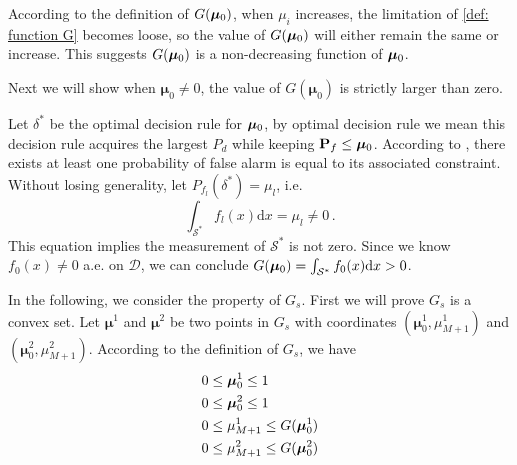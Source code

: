 According to the definition of $G(\boldsymbol{\mu}_0)$, when $\mu_i$ increases, the limitation of \eqref{def: function G} becomes loose, 
so the value of $G(\boldsymbol{\mu}_0)$ will either remain the same or increase. 
This suggests $G(\boldsymbol{\mu}_0)$ is a non-decreasing function of $\boldsymbol{\mu}_0$. 

Next we will show when $\boldsymbol{\mu}_0 \neq 0$, the value of $G(\boldsymbol{\mu}_0)$ is strictly larger than zero.

Let $\delta^\ast$ be the optimal decision rule for $\boldsymbol{\mu}_0$, by optimal decision rule we mean this decision rule acquires the largest $P_d$ while keeping $\mathbf{P}_f \leq \boldsymbol{\mu}_0$. 
According to \cite{zhang2000efficient}, there exists at least one probability of false alarm is equal to its associated constraint. Without losing generality, let $P_{f_l}(\delta^\ast) = \mu_l$, i.e. 
\[
\int_{\mathcal{S}^\ast}f_l(x)\mathrm{d}x = \mu_l \neq 0\,.
\]
This equation implies the measurement of $\mathcal{S}^\ast$  is not zero. Since we know $f_0(x) \neq 0$ a.e. on $\mathcal{D}$, we can conclude $G(\boldsymbol{\mu}_0) = \int_{\mathcal{S}^\ast}f_0(x)\mathrm{d}x > 0$. 

In the following, we consider the property of $G_s$. First we will prove $G_s$ is a convex set. 
Let $\boldsymbol{\mu}^1$ and  $\boldsymbol{\mu}^2$ be two points in $G_s$ with coordinates $(\boldsymbol{\mu}^1_0, \mu_{M+1}^1)$ and $(\boldsymbol{\mu}^2_0, \mu_{M+1}^2)$. According to the definition of $G_s$, we have 
\begin{subequations}
\label{1120t4}
\begin{align}
\label{1120night6}
0 &\leq \boldsymbol{\mu}_0^1 \leq 1\\
\label{1120night7}
0 &\leq \boldsymbol{\mu}^2_0 \leq 1\\
\label{1120night3}
0 &\leq \mu_{M+1}^1 \leq G(\boldsymbol{\mu}_0^1)\\
\label{1120night4}
0 &\leq \mu_{M+1}^2 \leq G(\boldsymbol{\mu}_0^2)
\end{align}
\end{subequations}

